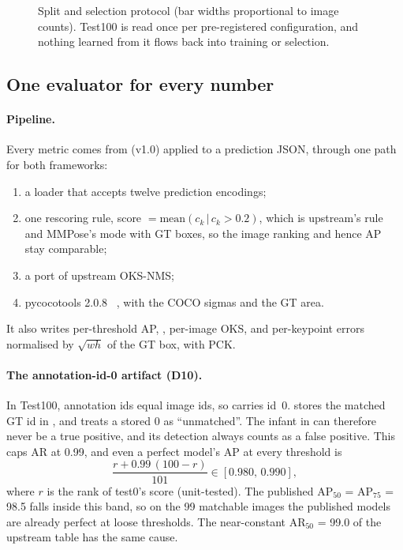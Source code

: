 \begin{figure}[t]
  \centering
  \resizebox{0.86\linewidth}{!}{}
  \caption{Split and selection protocol (bar widths proportional to image counts). Test100 is read once per pre-registered configuration, and nothing learned from it flows back into training or selection.}
  \label{fig:protocol}
\end{figure}

\subsection{One evaluator for every number}\label{sec:eval}

\paragraph{Pipeline.} Every metric comes from  (v1.0) applied to a prediction JSON, through one path for both frameworks:
\begin{enumerate}[leftmargin=*]
  \item a loader that accepts twelve prediction encodings;
  \item one rescoring rule, score $=\mathrm{mean}(c_k\,|\,c_k>0.2)$, which is upstream's rule and MMPose's  mode with GT boxes, so the image ranking and hence AP stay comparable;
  \item a port of upstream OKS-NMS;
  \item pycocotools 2.0.8 ~\citep{cocoapi}, with the COCO sigmas and the GT area.
\end{enumerate}
It also writes per-threshold AP, \APstrict{}, per-image OKS, and per-keypoint errors normalised by $\sqrt{wh}$ of the GT box, with PCK.

\paragraph{The annotation-id-0 artifact (D10).} In Test100, annotation ids equal image ids, so  carries id~0.  stores the matched GT id in , and  treats a stored 0 as ``unmatched''. The infant in  can therefore never be a true positive, and its detection always counts as a false positive.
This caps AR at 0.99, and even a perfect model's AP at every threshold is
\[
\frac{r+0.99\,(100-r)}{101}\in[0.980,\,0.990],
\]
where $r$ is the rank of test0's score (unit-tested).
The published AP$_{50}$ = AP$_{75}$ = 98.5 falls inside this band, so on the 99 matchable images the published models are already perfect at loose thresholds. The near-constant AR$_{50}$ = 99.0 of the upstream table has the same cause.

